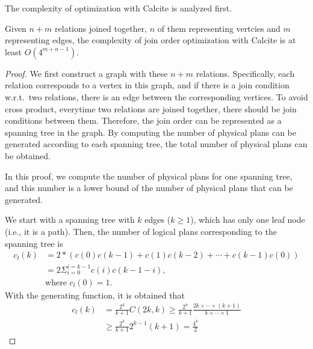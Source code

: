 The complexity of optimization with Calcite is analyzed first.
\begin{theorem}
    \label{theorem:complexity-of-calcite}
    Given $n + m$ relations joined together, $n$ of them representing vertcies and $m$ representing edges, the complexity of join order optimization with Calcite is at least $O(4^{m+n-1})$.
\end{theorem}
\begin{proof}
    We first construct a graph with these $n + m$ relations.
    Specifically, each relation corresponds to a vertex in this graph, and if there is a join condition w.r.t.~two relations, there is an edge between the corresponding vertices.
    To avoid cross product, everytime two relations are joined together, there should be join conditions between them.
    Therefore, the join order can be represented as a spanning tree in the graph.
    By computing the number of physical plans can be generated according to each spanning tree, the total number of physical plans can be obtained.
    
    In this proof, we compute the number of physical plans for one spanning tree, and this number is a lower bound of the number of physical plans that can be generated.

    We start with a spanning tree with $k$ edges ($k \geq 1$), which has only one leaf node (i.e., it is a path).
    Then, the number of logical plans corresponding to the spanning tree is
    \begin{equation*}
        \begin{split}
            c_l(k) & = 2 * (c(0)c(k-1) + c(1)c(k-2) + \cdots + c(k-1)c(0)) \\
            & = 2\Sigma_{i=0}^{i=k-1}c(i)c(k-1-i), \\
            & \text{where } c_l(0) = 1.
        \end{split}
    \end{equation*}
    With the generating function, it is obtained that 
    \begin{equation*}
        \begin{split}
            c_l(k) & = \frac{2^k}{k+1}C(2k, k) \geq \frac{2^k}{k+1}\frac{2k \times \cdots \times (k+1)}{k \times \cdots \times 1} \\
            & \geq \frac{2^k}{k+1}2^{k-1}(k+1) = \frac{4^k}{2}
        \end{split}
    \end{equation*}


\end{proof}
